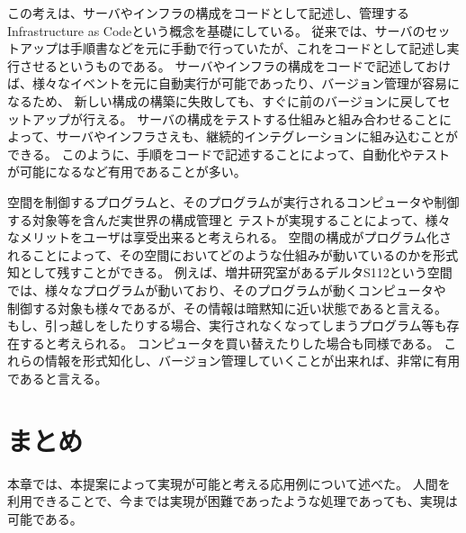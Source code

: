 この考えは、サーバやインフラの構成をコードとして記述し、管理するInfrastructure
as Codeという概念を基礎にしている。
従来では、サーバのセットアップは手順書などを元に手動で行っていたが、これをコードとして記述し実行させるというものである。
サーバやインフラの構成をコードで記述しておけば、様々なイベントを元に自動実行が可能であったり、バージョン管理が容易になるため、
新しい構成の構築に失敗しても、すぐに前のバージョンに戻してセットアップが行える。
サーバの構成をテストする仕組みと組み合わせることによって、サーバやインフラさえも、継続的インテグレーションに組み込むことができる。
このように、手順をコードで記述することによって、自動化やテストが可能になるなど有用であることが多い。

空間を制御するプログラムと、そのプログラムが実行されるコンピュータや制御する対象等を含んだ実世界の構成管理と
テストが実現することによって、様々なメリットをユーザは享受出来ると考えられる。
空間の構成がプログラム化されることによって、その空間においてどのような仕組みが動いているのかを形式知として残すことができる。
例えば、増井研究室があるデルタS112という空間では、様々なプログラムが動いており、そのプログラムが動くコンピュータや
制御する対象も様々であるが、その情報は暗黙知に近い状態であると言える。
もし、引っ越しをしたりする場合、実行されなくなってしまうプログラム等も存在すると考えられる。
コンピュータを買い替えたりした場合も同様である。
これらの情報を形式知化し、バージョン管理していくことが出来れば、非常に有用であると言える。

\section{まとめ}\label{ux307eux3068ux3081}

本章では、本提案によって実現が可能と考える応用例について述べた。
人間を利用できることで、今までは実現が困難であったような処理であっても、実現は可能である。
